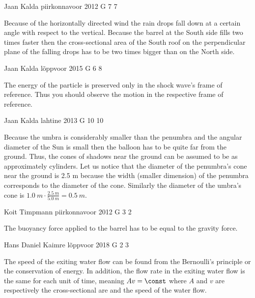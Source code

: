 \documentclass[11pt]{article}
\begin{document}
{Jaan Kalda} %
{piirkonnavoor} %
{2012} %
{G 7} %
{7} %
{

\ifEngHint
Because of the horizontally directed wind the rain drops fall down at a certain angle with respect to the vertical. Because the barrel at the South side fills two times faster then the cross-sectional area of the South roof on the perpendicular plane of the falling drops has to be two times bigger than on the North side.
\fi
}

{Jaan Kalda} %
{lõppvoor} %
{2015} %
{G 6} %
{8} %
{

\ifEngHint
The energy of the particle is preserved only in the shock wave’s frame of reference. Thus you should observe the motion in the respective frame of reference.
\fi
}

{Jaan Kalda} %
{lahtine} %
{2013} %
{G 10} %
{10} %
{

\ifEngHint
Because the umbra is considerably smaller than the penumbra and the angular diameter of the Sun is small then the balloon has to be quite far from the ground. Thus, the cones of shadows near the ground can be assumed to be as approximately cylinders. Let us notice that the diameter of the penumbra’s cone near the ground is 2.5 m because the width (smaller dimension) of the penumbra corresponds to the diameter of the cone. Similarly the diameter of the umbra’s cone is $\SI{1,0}{m}\cdot\frac{\SI{2,5}{m}}{\SI{5,0}{m}} = \SI{0,5}{m}$.
\fi
}

{Koit Timpmann} %
{piirkonnavoor} %
{2012} %
{G 3} %
{2} %
{

\ifEngHint
The buoyancy force applied to the barrel has to be equal to the gravity force.
\fi
}

{Hans Daniel Kaimre} %
{lõppvoor} %
{2018} %
{G 2} %
{3} %
{

\ifEngHint
The speed of the exiting water flow can be found from the Bernoulli’s principle or the conservation of energy. In addition, the flow rate in the exiting water flow is the same for each unit of time, meaning $Av = \const$ where $A$ and $v$ are respectively the cross-sectional are and the speed of the water flow.
\fi
}
\end{document}
